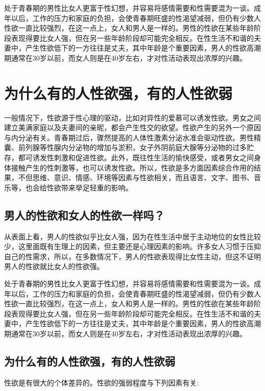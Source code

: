 \documentclass[12pt,UTF8]{ctexbook}
\begin{document}
处于青春期的男性比女人更富于性幻想，并容易将感情需要和性需要混为一谈。成年以后，工作的压力和家庭的负担，会使青春期旺盛的性渴望减弱，但仍有少数人性欲一直比较强烈，在这一点上，女人和男人是一样的。男性的性欲在某些年龄阶段表现得要比女人强，但在另一些年龄阶段却可能完全相反。在性生活不和谐的夫妻中，产生性欲低下的一方往往是丈夫，其中年龄是个重要因素，男人的性欲高潮期通常在30岁以前，而女人则是在40岁左右，才对性活动表现出浓厚的兴趣。

\chapter{为什么有的人性欲强，有的人性欲弱}

一般情况下，性欲源于性心理的驱动，比如对异性的爱慕可以诱发性欲。男女之间建立美满家庭以及夫妻间的亲昵，都会产生性交的欲望。性欲产生的另外一个原因与内分泌有关。青春期过后，骤然提高的人体性激素分泌水准会驱动性欲。男性精囊、前列腺等性腺内分泌物的增加与淤积，女子外阴前庭大腺等分泌物的过多贮存，都可诱发性刺激和促进性欲。此外，既往性生活的愉快感受，或者男女之间身体接触产生的性刺激等，也可以诱发性欲。所以，性欲是多方面因素综合作用的结果，不但思维、意识、情感、环境等因素与性欲相关，而且语言、文字、图书、音乐等，也会给性欲带来举足轻重的影响。

\section{男人的性欲和女人的性欲一样吗？}

从表面上看，男人的性欲似乎比女人强，因为在性生活中居于主动地位的女性比较少，这里面既有生理上的因素，但主要还是心理因素的影响。许多女人习惯于压抑自己的性需求，所以，在多数情况下，男人的性欲表现得比女性主动，但这不证明男人的性欲就比女人的性欲强。

处于青春期的男性比女人更富于性幻想，并容易将感情需要和性需要混为一谈。成年以后，工作的压力和家庭的负担，会使青春期旺盛的性渴望减弱，但仍有少数人性欲一直比较强烈，在这一点上，女人和男人是一样的。男性的性欲在某些年龄阶段表现得要比女人强，但在另一些年龄阶段却可能完全相反。在性生活不和谐的夫妻中，产生性欲低下的一方往往是丈夫，其中年龄是个重要因素，男人的性欲高潮期通常在30岁以前，而女人则是在40岁左右，才对性活动表现出浓厚的兴趣。

\section{为什么有的人性欲强，有的人性欲弱}

性欲是有很大的个体差异的。性欲的强弱程度与下列因素有关:
\end{document}
